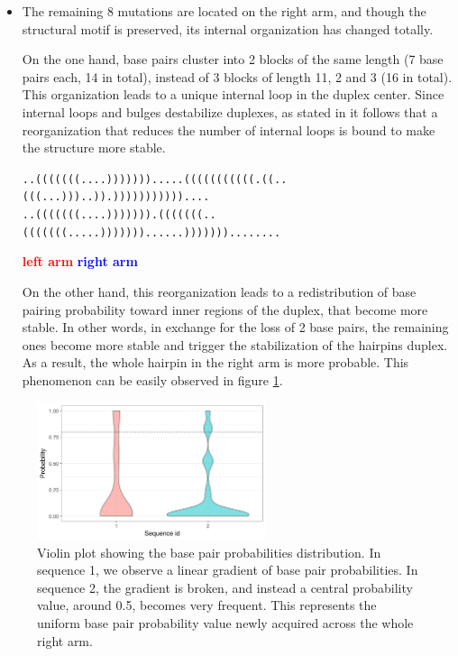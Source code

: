 \documentclass[10pt,a4paper]{article}
\begin{document}
\begin{itemize}
\item The remaining 8 mutations are located on the right arm, and though the structural motif is preserved, its internal organization has changed totally.

\subitem On the one hand, base pairs cluster into 2 blocks of the same length (7 base pairs each, 14 in total), instead of 3 blocks of length 11, 2 and 3 (16 in total). This organization leads to a unique internal loop in the duplex center. Since internal loops and bulges destabilize duplexes, as stated in \cite{} it follows that a reorganization that reduces the number of internal loops is bound to make the structure more stable.

\begin{center}
\footnotesize{\texttt{..(((((((....))))))).....(((((((((((.((..(((...)))..)).)))))))))))....} \\
\texttt{..(((((((....))))))).(((((((..(((((((.....)))))))......)))))))........}}  \\
\end{center}
\hspace*{4.4em} \textcolor{red}{\textbf{left arm}} \hspace*{12em} \textcolor{blue}{\textbf{right arm}}



\subitem On the other hand, this reorganization leads to a redistribution of base pairing probability toward inner regions of the duplex, that become more stable. In other words, in exchange for the loss of 2 base pairs, the remaining ones become more stable and trigger the stabilization of the hairpin\textquotesingle s duplex. As a result, the whole hairpin in the right arm is more probable. This phenomenon can be easily observed in figure \ref{fig:violin}.


\end{itemize}


\begin{figure}[!h]
\centering
\includegraphics[width = 0.6\textwidth]{figures/violin.png}
\caption{Violin plot showing the base pair probabilities distribution. In sequence 1, we observe a linear gradient of base pair probabilities. In sequence 2, the gradient is broken, and instead a central probability value, around 0.5, becomes very frequent. This represents the uniform base pair probability value newly acquired across the whole right arm.}
\label{fig:violin}
\end{figure}
\end{document}
